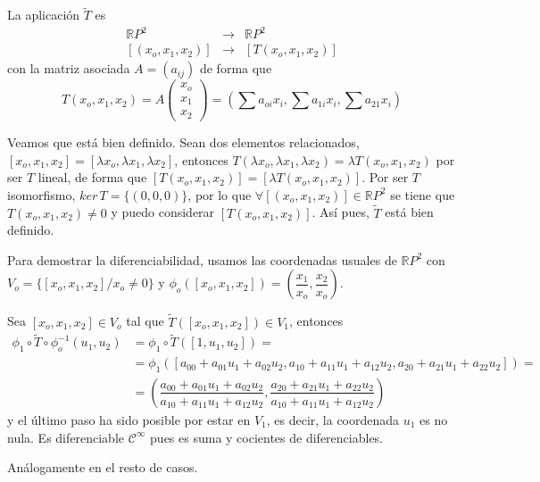 \begin{sol}
    La aplicaci\'on $\tilde{T}$ es 
    $$\begin{array}{rcl}
          \mathbb R P^2 & \longrightarrow & \mathbb RP^2  \\
         \left[(x_o,x_1,x_2)\right] & \longrightarrow & \left[T(x_o,x_1,x_2)\right]  
    \end{array}$$
    con la matriz asociada $A=(a_{ij})$ de forma que 
    $$T(x_o,x_1,x_2) = A \begin{pmatrix}
        x_o \\ x_1 \\ x_2 
    \end{pmatrix}= (\sum a_{oi} x_i , \sum a_{1i} x_i , \sum a_{21} x_i)$$
    
    Veamos que est\'a bien definido. Sean dos elementos relacionados, $[x_o,x_1,x_2]=[\lambda x_o, \lambda x_1, \lambda x_2]$, entonces $T(\lambda x_o, \lambda x_1, \lambda x_2) = \lambda T(x_o,x_1,x_2)$ por ser $T$ lineal, de forma que $[T(x_o,x_1,x_2)] = [\lambda T(x_o,x_1,x_2)]$. Por ser $T$ isomorfismo, $ker\, T = \{(0,0,0)\}$, por lo que $\forall [(x_o,x_1,x_2)] \in \mathbb R P^2 $ se tiene que $T(x_o,x_1,x_2) \neq 0$ y puedo considerar $[T(x_o,x_1,x_2)]$. As\'i pues, $\tilde{T}$ est\'a bien definido. 

    Para demostrar la diferenciabilidad, usamos las coordenadas usuales de $\mathbb RP^2$ con $V_o = \{[x_o,x_1,x_2] / x_o \neq 0\}$ y $\phi_o([x_o,x_1,x_2])=\left(\dfrac{x_1}{x_o}, \dfrac{x_2}{x_o}\right)$. 
    
    Sea $[x_o,x_1,x_2] \in V_o$ tal que $\tilde{T}([x_o,x_1,x_2]) \in V_1$, entonces
    \[\begin{split}
        \phi_1 \circ \tilde T \circ \phi_o^{-1}(u_1,u_2) & = \phi_1 \circ \tilde T ([1,u_1,u_2]) = \\ & = \phi_1\left( [a_{00}+a_{01}u_1 + a_{02} u_2, a_{10} + a_{11}u_1+a_{12}u_2, a_{20} + a_{21} u_1 + a_{22} u_2 ]\right)=\\ & = \left( \dfrac{a_{00}+a_{01}u_1 + a_{02} u_2}{a_{10} + a_{11}u_1+a_{12}u_2}, \dfrac{a_{20} + a_{21} u_1 + a_{22} u_2}{a_{10} + a_{11}u_1+a_{12}u_2}\right)
    \end{split}\]
    y el \'ultimo paso ha sido posible por estar en $V_1$, es decir, la coordenada $u_1$ es no nula. Es diferenciable $\mathcal C^{\infty}$ pues es suma y cocientes de diferenciables. 

    An\'alogamente en el resto de casos.
\end{sol}
